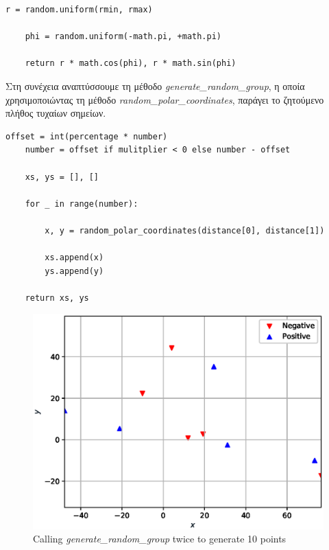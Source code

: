 \documentclass[12pt]{article}
\newenvironment{matlab}
	{\begin{figure}[H]\centering\captionsetup{justification=centering}}
	{\end{figure}}
\begin{document}
\begin{lstlisting}[caption={Η μέθοδος \textit{random\_polar\_coordinates}}]
    r = random.uniform(rmin, rmax)

    phi = random.uniform(-math.pi, +math.pi)

    return r * math.cos(phi), r * math.sin(phi)
\end{lstlisting}

Στη συνέχεια αναπτύσσουμε τη μέθοδο \textit{generate\_random\_group},
η οποία χρησιμοποιώντας τη μέθοδο \textit{random\_polar\_coordinates},
παράγει το ζητούμενο πλήθος τυχαίων σημείων. \\

\begin{lstlisting}[caption={Η μέθοδος \textit{generate\_random\_group}}]
    offset = int(percentage * number)
    number = offset if mulitplier < 0 else number - offset

    xs, ys = [], []

    for _ in range(number):

        x, y = random_polar_coordinates(distance[0], distance[1])

        xs.append(x)
        ys.append(y)

    return xs, ys
\end{lstlisting}

\pagebreak

\begin{matlab}
    \includegraphics[scale=0.75]{figures/random}
    \caption{Calling \textit{generate\_random\_group} twice to generate 10 points }
\end{matlab}
\end{document}
